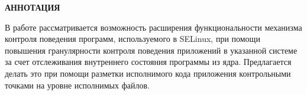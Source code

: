\documentclass[russian,utf8,pointsubsection,emptystyle, 12pt]{eskdtext}
\begin{document}
\maketitle


\large{\textbf{АННОТАЦИЯ}}

В работе рассматривается возможность расширения функциональности
механизма контроля поведения программ, используемого в SELinux, при 
помощи повышения гранулярности контроля поведения приложений
в указанной системе за счет отслеживания внутреннего состояния
программы из ядра. Предлагается делать это при помощи
разметки исполнимого кода приложения контрольными точками 
на уровне исполнимых файлов. 

\newpage

\tableofcontents
\newpage

%






% 
\end{document}
